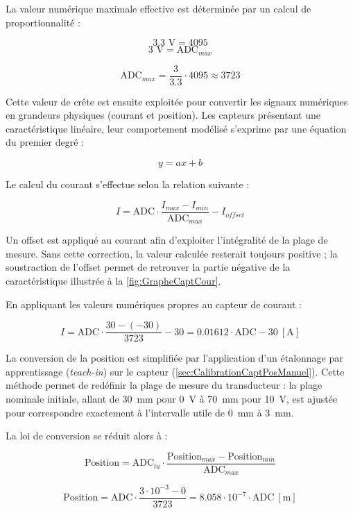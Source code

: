 La valeur numérique maximale effective est déterminée par un calcul de proportionnalité :

$$3.3\text{ V} = 4095$$
$$3\text{ V} = \text{ADC}_{max}$$

\begin{equation}
    \text{ADC}_{max} = \frac{3}{3.3} \cdot 4095 \approx 3723
    \label{eq:adc_max_calc}
\end{equation}

Cette valeur de crête est ensuite exploitée pour convertir les signaux numériques en grandeurs physiques (courant et position). Les capteurs présentant une caractéristique linéaire, leur comportement modélisé s'exprime par une équation du premier degré :

\begin{equation}
    y = ax + b
    \label{eq:droite_lineaire}
\end{equation}

Le calcul du courant s'effectue selon la relation suivante :

$$I = \text{ADC} \cdot \frac{I_{max} - I_{min}}{\text{ADC}_{max}} - I_{offset}$$

Un offset est appliqué au courant afin d'exploiter l'intégralité de la plage de mesure. Sans cette correction, la valeur calculée resterait toujours positive ; la soustraction de l'offset permet de retrouver la partie négative de la caractéristique illustrée à la \autoref{fig:GrapheCaptCour}.

En appliquant les valeurs numériques propres au capteur de courant :

\begin{equation}
    I = \text{ADC} \cdot \frac{30 - (-30)}{3723} - 30 = 0.01612 \cdot \text{ADC} - 30~[\text{A}]
    \label{eq:conv_courant}
\end{equation}

La conversion de la position est simplifiée par l'application d'un étalonnage par apprentissage (\textit{teach-in}) sur le capteur (\autoref{sec:CalibrationCaptPosManuel}). Cette méthode permet de redéfinir la plage de mesure du transducteur : la plage nominale initiale, allant de 30~mm pour 0~V à 70~mm pour 10~V, est ajustée pour correspondre exactement à l'intervalle utile de 0~mm à 3~mm.

La loi de conversion se réduit alors à :

$$\text{Position} = \text{ADC}_{lu} \cdot \frac{\text{Position}_{max} - \text{Position}_{min}}{\text{ADC}_{max}}$$

\begin{equation}
    \text{Position} = \text{ADC} \cdot \frac{3 \cdot 10^{-3} - 0}{3723} = 8.058 \cdot 10^{-7} \cdot \text{ADC}~[\text{m}]
    \label{eq:conv_position}
\end{equation}

